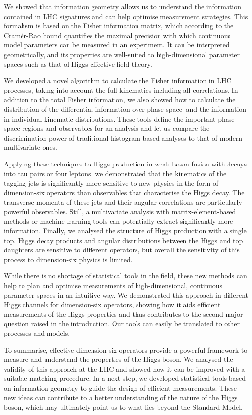 We showed that information geometry allows us to understand the
information contained in LHC signatures and can help optimise
measurement strategies. This formalism is based on the Fisher
information matrix, which according to the Cram\'er-Rao bound
quantifies the maximal precision with which continuous model
parameters can be measured in an experiment. It can be interpreted
geometrically, and its properties are well-suited to high-dimensional
parameter spaces such as that of Higgs effective field theory.

We developed a novel algorithm to calculate the Fisher information in
LHC processes, taking into account the full kinematics including all
correlations. In addition to the total Fisher information, we also
showed how to calculate the distribution of the differential
information over phase space, and the information in individual
kinematic distributions. These tools define the important phase-space
regions and observables for an analysis and let us compare the
discrimination power of traditional histogram-based analyses to that
of modern multivariate ones.

Applying these techniques to Higgs production in weak boson fusion
with decays into tau pairs or four leptons, we demonstrated that the
kinematics of the tagging jets is significantly more sensitive to new
physics in the form of dimension-six operators than observables that
characterise the Higgs decay.  The transverse momenta of these jets
and their angular correlations are particularly powerful
observables. Still, a multivariate analysis with matrix-element-based
methods or machine-learning tools can potentially extract
significantly more information. Finally, we analysed the structure of
Higgs production with a single top. Higgs decay products and angular
distributions between the Higgs and top daughters are sensitive to
different operators, but overall the sensitivity of this process to
dimension-six physics is limited.

%
While there is no shortage of statistical tools in the field, these
new methods can help to plan and optimise measurements of
high-dimensional, continuous parameter spaces in an intuitive way.  We
demonstrated this approach in different Higgs channels for
dimension-six operators, showing how it aids efficient measurements of
the Higgs properties and thus contributes to the second major question
raised in the introduction. Our tools can easily be translated to
other processes and models.

\newparagraph
%
To summarise, effective dimension-six operators provide a powerful
framework to measure and understand the properties of the Higgs
boson. We analysed the validity of this approach at the LHC and showed
how it can be improved with a suitable matching procedure. In a next
step, we developed statistical tools based on information geometry to
guide the design of efficient measurements. These new ideas
can contribute to a better understanding of the nature of the Higgs
boson, which may ultimately point us to what lies beyond the Standard
Model.
